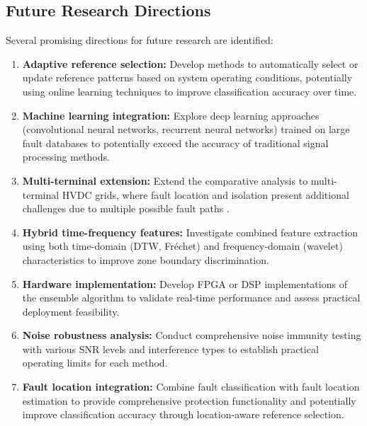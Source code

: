 \documentclass[journal]{IEEEtran}
\begin{document}
\subsection{Future Research Directions}

Several promising directions for future research are identified:

\begin{enumerate}
    \item \textbf{Adaptive reference selection:} Develop methods to automatically select or update reference patterns based on system operating conditions, potentially using online learning techniques to improve classification accuracy over time.
    
    \item \textbf{Machine learning integration:} Explore deep learning approaches (convolutional neural networks, recurrent neural networks) trained on large fault databases to potentially exceed the accuracy of traditional signal processing methods.
    
    \item \textbf{Multi-terminal extension:} Extend the comparative analysis to multi-terminal HVDC grids, where fault location and isolation present additional challenges due to multiple possible fault paths \cite{beerten2012}.
    
    \item \textbf{Hybrid time-frequency features:} Investigate combined feature extraction using both time-domain (DTW, Fréchet) and frequency-domain (wavelet) characteristics to improve zone boundary discrimination.
    
    \item \textbf{Hardware implementation:} Develop FPGA or DSP implementations of the ensemble algorithm to validate real-time performance and assess practical deployment feasibility.
    
    \item \textbf{Noise robustness analysis:} Conduct comprehensive noise immunity testing with various SNR levels and interference types to establish practical operating limits for each method.
    
    \item \textbf{Fault location integration:} Combine fault classification with fault location estimation to provide comprehensive protection functionality and potentially improve classification accuracy through location-aware reference selection.
\end{enumerate}
\end{document}
